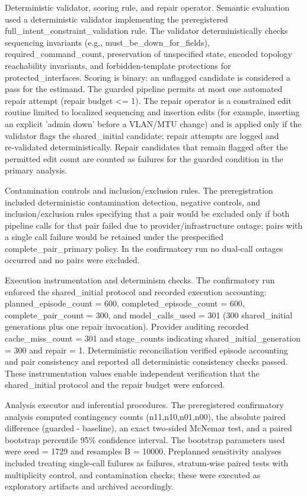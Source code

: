 \documentclass[conference]{IEEEtran}
\begin{document}
Deterministic validator, scoring rule, and repair operator. Semantic evaluation used a deterministic validator implementing the preregistered full\_intent\_constraint\_validation rule. The validator deterministically checks sequencing invariants (e.g., must\_be\_down\_for\_fields), required\_command\_count, preservation of unspecified state, encoded topology reachability invariants, and forbidden‑template protections for protected\_interfaces. Scoring is binary: an unflagged candidate is considered a pass for the estimand. The guarded pipeline permits at most one automated repair attempt (repair budget <= 1). The repair operator is a constrained edit routine limited to localized sequencing and insertion edits (for example, inserting an explicit 'admin down' before a VLAN/MTU change) and is applied only if the validator flags the shared\_initial candidate; repair attempts are logged and re‑validated deterministically. Repair candidates that remain flagged after the permitted edit count are counted as failures for the guarded condition in the primary analysis.

Contamination controls and inclusion/exclusion rules. The preregistration included deterministic contamination detection, negative controls, and inclusion/exclusion rules specifying that a pair would be excluded only if both pipeline calls for that pair failed due to provider/infrastructure outage; pairs with a single call failure would be retained under the prespecified complete\_pair\_primary policy. In the confirmatory run no dual‑call outages occurred and no pairs were excluded.

Execution instrumentation and determinism checks. The confirmatory run enforced the shared\_initial protocol and recorded execution accounting: planned\_episode\_count = 600, completed\_episode\_count = 600, complete\_pair\_count = 300, and model\_calls\_used = 301 (300 shared\_initial generations plus one repair invocation). Provider auditing recorded cache\_miss\_count = 301 and stage\_counts indicating shared\_initial\_generation = 300 and repair = 1. Deterministic reconciliation verified episode accounting and pair consistency and reported all deterministic consistency checks passed. These instrumentation values enable independent verification that the shared\_initial protocol and the repair budget were enforced.

Analysis executor and inferential procedures. The preregistered confirmatory analysis computed contingency counts (n11,n10,n01,n00), the absolute paired difference (guarded - baseline), an exact two‑sided McNemar test, and a paired bootstrap percentile 95\% confidence interval. The bootstrap parameters used were seed = 1729 and resamples B = 10000. Preplanned sensitivity analyses included treating single‑call failures as failures, stratum‑wise paired tests with multiplicity control, and contamination checks; these were executed as exploratory artifacts and archived accordingly.
\end{document}
